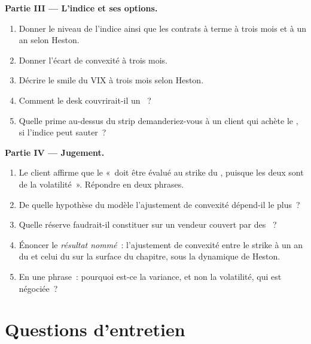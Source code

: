 \begin{problem}
\medskip\noindent\textbf{Partie III --- L'indice et ses options.}
\begin{enumerate}[resume]
\item Donner le niveau de l'indice ainsi que les contrats à terme à trois mois et à un an selon Heston.
\item Donner l'écart de convexité à trois mois.
\item Décrire le smile du VIX à trois mois selon Heston.
\item Comment le desk couvrirait-il un ~?
\item Quelle prime au-dessus du strip demanderiez-vous à un client qui achète le , si l'indice peut sauter~?
\end{enumerate}

\medskip\noindent\textbf{Partie IV --- Jugement.}
\begin{enumerate}[resume]
\item Le client affirme que le  «~doit être évalué au strike du , puisque les deux sont
de la volatilité~». Répondre en deux phrases.
\item De quelle hypothèse du modèle l'ajustement de convexité dépend-il le plus~?
\item Quelle réserve faudrait-il constituer sur un  vendeur couvert par des ~?
\item Énoncer le \emph{résultat nommé}~: l'ajustement de convexité entre le strike à un an du  et
celui du  sur la surface du chapitre, sous la dynamique de Heston.
\item En une phrase~: pourquoi est-ce la variance, et non la volatilité, qui est négociée~?
\end{enumerate}
\end{problem}

\section{Questions d'entretien}

